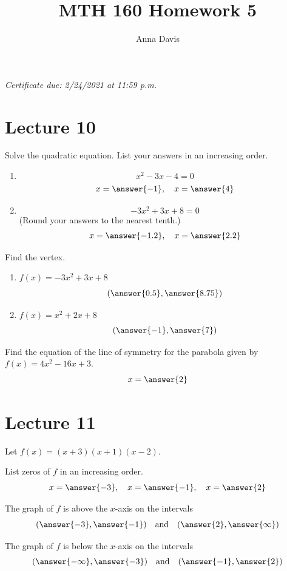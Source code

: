 \documentclass{ximera}
\author{Anna Davis} \title{MTH 160 Homework 5}
\begin{document}
\begin{abstract}

\end{abstract}
\maketitle
 \textit{Certificate due: 2/24/2021 at 11:59 p.m.}
 \section{Lecture 10}
 
  \begin{problem}\label{prob:160hom5prob1} 
  Solve the quadratic equation.  List your answers in an increasing order.
  \begin{enumerate}
      \item $$x^2-3x-4=0$$
      $$x=\answer{-1},\quad x=\answer{4}$$
      \item $$-3x^2+3x+8=0$$ (Round your answers to the nearest tenth.)
      $$x=\answer{-1.2},\quad x=\answer{2.2}$$
  \end{enumerate}
  \end{problem}
  
  \begin{problem}\label{prob:160hom5prob2} 
  Find the vertex.
  \begin{enumerate}
      \item $f(x)=-3x^2+3x+8$
      $$(\answer{0.5},\answer{8.75})$$
      \item $f(x)=x^2+2x+8$
      $$(\answer{-1},\answer{7})$$
  \end{enumerate}
  \end{problem}
  
  \begin{problem}\label{prob:160hom5prob3} 
  Find the equation of the line of symmetry for the parabola given by $f(x)=4x^2-16x+3$.
  $$x=\answer{2}$$
  \end{problem}
  
  \section{Lecture 11}
  
  \begin{problem}\label{prob:160hom5prob5} 
  Let $f(x)=(x+3)(x+1)(x-2)$.  
  
  List zeros of $f$ in an increasing order.
  $$x=\answer{-3},\quad x=\answer{-1},\quad x=\answer{2}$$
  
  The graph of $f$ is above the $x$-axis on the intervals
  $$(\answer{-3},\answer{-1})\quad \mbox{and}\quad (\answer{2},\answer{\infty})$$
  
  The graph of $f$ is below the $x$-axis on the intervals
  $$(\answer{-\infty},\answer{-3})\quad \mbox{and}\quad (\answer{-1},\answer{2})$$
  \end{problem}
  
\end{document}
